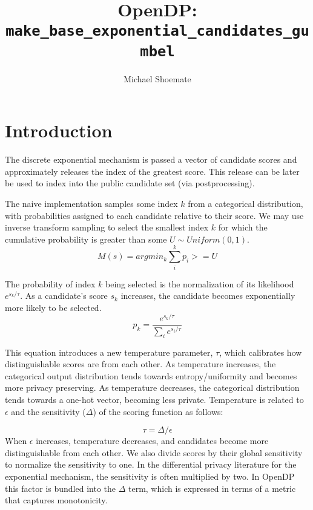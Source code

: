 

\title{OpenDP: \texttt{make\_base\_exponential\_candidates\_gumbel}}
\author{Michael Shoemate}

\maketitle

\section{Introduction}
The discrete exponential mechanism is passed a vector of candidate scores 
and approximately releases the index of the greatest score.
This release can be later be used to index into the public candidate set (via postprocessing).

The naive implementation samples some index $k$ from a categorical distribution, 
with probabilities assigned to each candidate relative to their score.
We may use inverse transform sampling to select the smallest index $k$ for which the cumulative probability is greater than some $U \sim Uniform(0, 1)$.
\begin{equation}
    \label{m-naive}
    M(s) = argmin_k \sum_i^k p_i >= U
\end{equation}

The probability of index $k$ being selected is the normalization of its likelihood $e^{s_k / \tau}$.
As a candidate's score $s_k$ increases, the candidate becomes exponentially more likely to be selected.
\begin{equation}
    \label{prob-of-k}
    p_k = \frac{e^{s_k / \tau}}{\sum_i e^{s_i / \tau}}
\end{equation}

This equation introduces a new temperature parameter, $\tau$, which calibrates how distinguishable scores are from each other.
As temperature increases, the categorical output distribution tends towards entropy/uniformity and becomes more privacy preserving.
As temperature decreases, the categorical distribution tends towards a one-hot vector, becoming less private.
Temperature is related to $\epsilon$ and the sensitivity ($\Delta$) of the scoring function as follows:

\begin{equation}
    \tau = \Delta / \epsilon
\end{equation}
When $\epsilon$ increases, temperature decreases, and candidates become more distinguishable from each other.
We also divide scores by their global sensitivity to normalize the sensitivity to one.
In the differential privacy literature for the exponential mechanism, the sensitivity is often multiplied by two.
In OpenDP this factor is bundled into the $\Delta$ term, which is expressed in terms of a metric that captures monotonicity.


